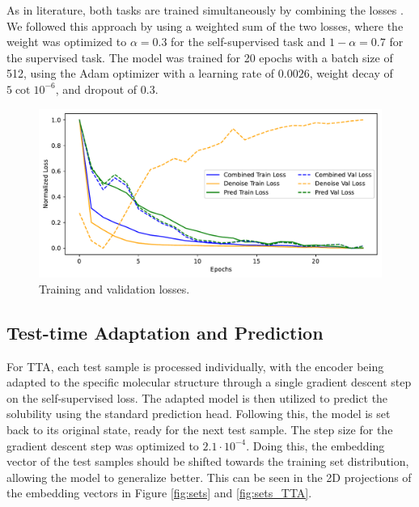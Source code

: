 \documentclass[11pt,a4paper]{article}
\begin{document}
As in literature, both tasks are trained simultaneously by combining the losses \cite{cui2025online, wang2022test}. We followed this approach by using a weighted sum of the two losses, where the weight was optimized to $\alpha = 0.3$ for the self-supervised task and $ 1 - \alpha = 0.7$ for the supervised task. The model was trained for 20 epochs with a batch size of 512, using the Adam optimizer with a learning rate of $0.0026$, weight decay of $5 \cot 10^{-6}$, and dropout of $0.3$.

\begin{figure}[htbp]
        \centering
        \includegraphics[width=1\textwidth]{loss_plot.pdf}
        \caption{Training and validation losses.}
        \label{fig:loss_plot}
\end{figure}

\subsection{Test-time Adaptation and Prediction}

For TTA, each test sample is processed individually, with the encoder being adapted to the specific molecular structure through a single gradient descent step on the self-supervised loss. The adapted model is then utilized to predict the solubility using the standard prediction head. Following this, the model is set back to its original state, ready for the next test sample. The step size for the gradient descent step was optimized to $2.1 \cdot 10^{-4}$. Doing this, the embedding vector of the test samples should be shifted towards the training set distribution, allowing the model to generalize better. This can be seen in the 2D projections of the embedding vectors in Figure \ref{fig:sets} and \ref{fig:sets_TTA}.
\end{document}
